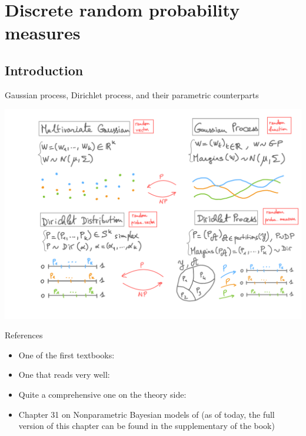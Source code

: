\section{Discrete random probability measures}


\subsection{Introduction}



\begin{frame}{Gaussian process, Dirichlet process, and their parametric counterparts}
	\begin{center}
		\includegraphics[width=\textwidth]{figures_julyan/gp/gp-and-dp.pdf}
	\end{center}
\end{frame}




\begin{frame}{References}
\begin{itemize}
	\item \alert{One of the first textbooks}: 
	\item \alert{One that reads very well}: 
	\item \alert{Quite a comprehensive one on the theory side}: 
	\item \alert{Chapter 31} on Nonparametric Bayesian models of  (as of today, the full version of this chapter can be found in the supplementary of the book)
\end{itemize}
\end{frame}


